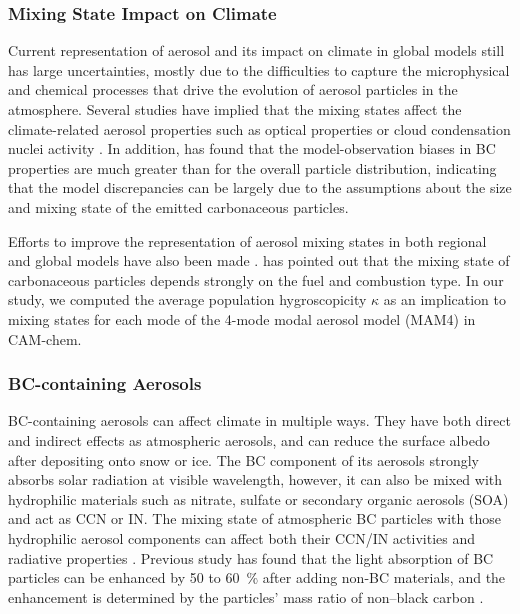 \documentclass[12pt, fullpage]{uiucthesis2009}
\begin{document}
	\subsubsection{Mixing State Impact on Climate}
	Current representation of aerosol and its impact on climate in global models still has large uncertainties, mostly due to the difficulties to capture the microphysical and chemical processes that drive the evolution of aerosol particles in the atmosphere. Several studies have implied that the mixing states affect the climate-related aerosol properties such as optical properties or cloud condensation nuclei activity \citep[e.g.][]{jacobson2001strong,zaveri2010contributions,koch2009evaluation}. In addition, \citet{Reddington2013} has found that the model-observation biases in BC properties are much greater than for the overall particle distribution, indicating that the model discrepancies can be largely due to the assumptions about the size and mixing state of the emitted carbonaceous particles. 
	
	Efforts to improve the representation of aerosol mixing states in both regional and global models have also been made  \citep[e.g.][]{jacobson2001strong,Riemer2013}. \citet{Riemer2013} has pointed out that the mixing state of carbonaceous particles depends strongly on the fuel and combustion type. In our study, we computed the average population hygroscopicity $\kappa$ as an implication to mixing states for each mode of the 4-mode modal aerosol model (MAM4) in CAM-chem.
	
	\subsubsection{BC-containing Aerosols}
	BC-containing aerosols can affect climate in multiple ways. They have both direct and indirect effects as atmospheric aerosols, and can reduce the surface albedo after depositing onto snow or ice. The BC component of its aerosols strongly absorbs solar radiation at visible wavelength, however, it can also be mixed with hydrophilic materials such as nitrate, sulfate or secondary organic aerosols (SOA) and act as CCN or IN. The mixing state of atmospheric BC particles with those hydrophilic aerosol components can affect both their CCN/IN activities and radiative properties \citep[e.g.][]{cheng2006}. Previous study has found that the light absorption of BC particles can be enhanced by 50 to 60~$\%$ after adding non-BC materials, and the enhancement is determined by the particles' mass ratio of non--black carbon \citep{liu2017black}. 
	
\end{document}
